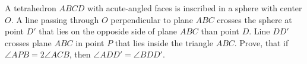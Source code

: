 A tetrahedron $ABCD$ with acute-angled faces is inscribed in a sphere with center $O$. A line passing through $O$ perpendicular to plane $ABC$ crosses the sphere at point $D'$ that lies on the opposide side of plane $ABC$ than point $D$. Line $DD'$ crosses plane $ABC$ in point $P$ that lies inside the triangle $ABC$. Prove, that if $\angle APB=2\angle ACB$, then $\angle ADD'=\angle BDD'$.